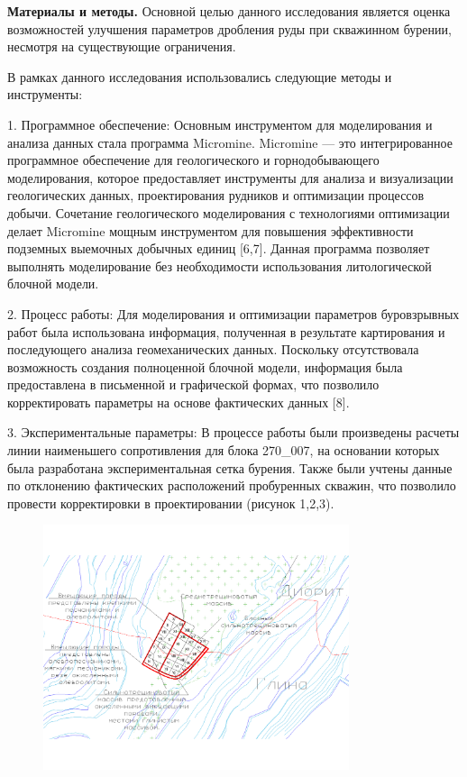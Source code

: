 {\bfseries Материалы и методы.} Основной целью данного исследования
является оценка возможностей улучшения параметров дробления руды при
скважинном бурении, несмотря на существующие ограничения.

В рамках данного исследования использовались следующие методы и
инструменты:

1. Программное обеспечение: Основным инструментом для моделирования и
анализа данных стала программа Micromine. Micromine --- это
интегрированное программное обеспечение для геологического и
горнодобывающего моделирования, которое предоставляет инструменты для
анализа и визуализации геологических данных, проектирования рудников и
оптимизации процессов добычи. Сочетание геологического моделирования с
технологиями оптимизации делает Micromine мощным инструментом для
повышения эффективности подземных выемочных добычных единиц {[}6,7{]}.
Данная программа позволяет выполнять моделирование без необходимости
использования литологической блочной модели.

2. Процесс работы: Для моделирования и оптимизации параметров
буровзрывных работ была использована информация, полученная в результате
картирования и последующего анализа геомеханических данных. Поскольку
отсутствовала возможность создания полноценной блочной модели,
информация была предоставлена в письменной и графической формах, что
позволило корректировать параметры на основе фактических данных {[}8{]}.

3. Экспериментальные параметры: В процессе работы были произведены
расчеты линии наименьшего сопротивления для блока 270\_007, на основании
которых была разработана экспериментальная сетка бурения. Также были
учтены данные по отклонению фактических расположений пробуренных
скважин, что позволило провести корректировки в проектировании (рисунок
1,2,3).

\begin{figure}[H]
	\centering
	\includegraphics[width=0.8\textwidth]{media/gor/image27}
	\caption*{}
\end{figure}


